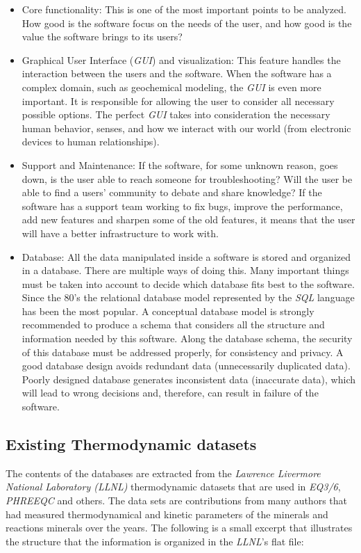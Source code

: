 \begin{itemize}
\item Core functionality: This is one of the most important points to be analyzed. How good is the software focus on the needs of the user, and how good is the value the software brings to its users?

\item Graphical User Interface (\emph{GUI}) and visualization: This feature handles the interaction between the users and the software. When the software has a complex domain, such as geochemical modeling, the \emph{GUI} is even more important. It is responsible for allowing the user to consider all necessary possible options. The perfect \emph{GUI} takes into consideration the necessary human behavior, senses, and how we interact with our world (from electronic devices to human relationships).

\item Support and Maintenance: If the software, for some unknown reason, goes down, is the user able to reach someone for troubleshooting? Will the user be able to find a users' community to debate and share knowledge? If the software has a support team working to fix bugs, improve the performance, add new features and sharpen some of the old features, it means that the user will have a better infrastructure to work with.

\item Database: All the data manipulated inside a software is stored and organized in a database. There are multiple ways of doing this. Many important things must be taken into account to decide which database fits best to the software. Since the 80's the relational database model represented by the \emph{SQL} language has been the most popular. A conceptual database model is strongly recommended to produce a schema that considers all the structure and information needed by this software. Along the database schema, the security of this database must be addressed properly, for consistency and privacy. A good database design avoids redundant data (unnecessarily duplicated data). Poorly designed database generates inconsistent data (inaccurate data), which will lead to wrong decisions and, therefore, can result in failure of the software.
\end{itemize}


\subsection{Existing Thermodynamic datasets}
The contents of the databases are extracted from the \emph{Lawrence Livermore National Laboratory (LLNL)} thermodynamic datasets that are used in \emph{EQ3/6}, \emph{PHREEQC} and others. The data sets are contributions from many authors that had measured thermodynamical and kinetic parameters of the minerals and reactions minerals over the years. The following is a small excerpt that illustrates the structure that the information is organized in the \emph{LLNL}'s flat file:


